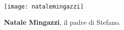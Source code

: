  \begin{figure}[htb]
    \centering
    \texttt{[image: natalemingazzi]}
    \caption[Natale Mingazzi in casa]{\textbf{Natale Mingazzi}, il padre di Stefano.  \label{fig:natalemingazzi}}
\end{figure}